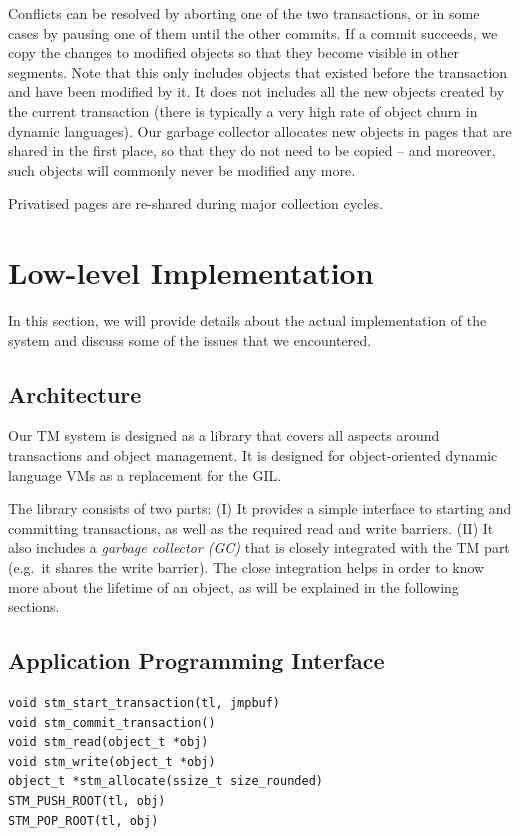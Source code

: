 \documentclass{sigplanconf}
\begin{document}
Conflicts can be resolved by aborting one of the two transactions, or in
some cases by pausing one of them until the other commits.  If a commit
succeeds, we copy the changes to modified objects so that they become
visible in other segments.  Note that this only includes objects that
existed before the transaction and have been modified by it.  It does
not includes all the new objects created by the current transaction
(there is typically a very high rate of object churn in dynamic languages).
Our garbage collector allocates new objects in pages that are shared in
the first place, so that they do not need to be copied -- and moreover,
such objects will commonly never be modified any more.

Privatised pages are re-shared during major collection cycles.



\section{Low-level Implementation\label{sub:Low-level-Implementation}}

In this section, we will provide details about the actual
implementation of the system and discuss some of the issues that we
encountered.


\subsection{Architecture}

Our TM system is designed as a library that covers all aspects around
transactions and object management. It is designed for object-oriented
dynamic language VMs as a replacement for the GIL.

The library consists of two parts: (I) It provides a simple interface
to starting and committing transactions, as well as the required read
and write barriers. (II) It also includes a \emph{garbage collector
(GC)} that is closely integrated with the TM part (e.g.\ it shares the
write barrier). The close integration helps in order to know more
about the lifetime of an object, as will be explained in the following
sections.


\subsection{Application Programming Interface\label{sub:Application-Programming-Interfac}}

\begin{lstlisting}
void stm_start_transaction(tl, jmpbuf)
void stm_commit_transaction()
void stm_read(object_t *obj)
void stm_write(object_t *obj)
object_t *stm_allocate(ssize_t size_rounded)
STM_PUSH_ROOT(tl, obj)
STM_POP_ROOT(tl, obj)
\end{lstlisting}
\end{document}
